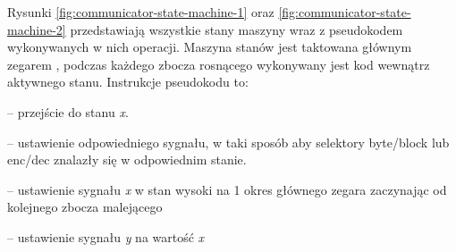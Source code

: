 Rysunki \ref{fig:communicator-state-machine-1} oraz \ref{fig:communicator-state-machine-2} przedstawiają wszystkie stany maszyny wraz z pseudokodem wykonywanych w nich operacji. Maszyna stanów jest taktowana głównym zegarem , podczas każdego zbocza rosnącego wykonywany jest kod wewnątrz aktywnego stanu. Instrukcje pseudokodu to:
\begin{description}[noitemsep]
	\item[\textbf{state \textit{x}}] -- przejście do stanu \textit{x}.
	\item[\textbf{mux \textit{x}}] -- ustawienie odpowiedniego sygnału, w taki sposób aby selektory byte/block lub enc/dec znalazły się w odpowiednim stanie.
	\item[\textbf{trigger \textit{x}}] -- ustawienie sygnału \textit{x} w stan wysoki na 1 okres głównego zegara zaczynając od kolejnego zbocza malejącego 
	\item[\textbf{store \textit{x} into \textit{y}}] -- ustawienie sygnału \textit{y} na wartość \textit{x}
\end{description}




